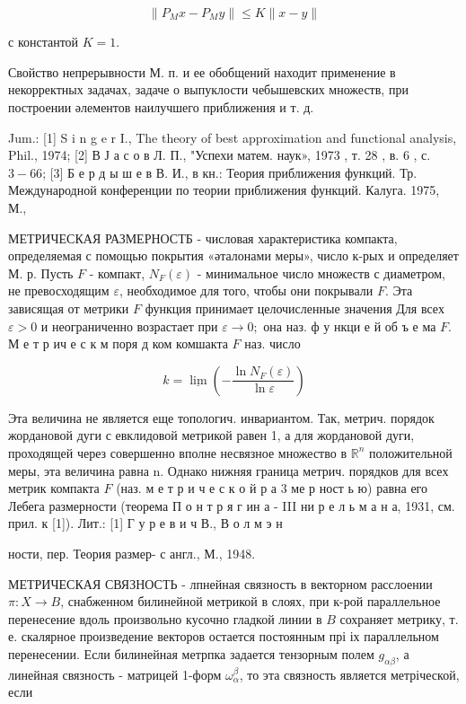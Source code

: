 \documentclass[10pt]{article}
\begin{document}
\[

\left\|P_{M} x-P_{M} y\right\| \leqslant K\|x-y\|

\]



с константой $K=1$.



Свойство непрерывности М. п. и ее обобщений находит применение в некорректных задачах, задаче о выпуклости чебышевских множеств, при построении әлементов наилучшего приближения и т. д.



Jum.: [1] S i $\mathrm{n}$ g e r I., The theory of best approximation and functional analysis, Phil., 1974; [2] В Ј а с о в Л. П., "Успехи матем. наук», 1973 , т. 28 , в. 6 , с. $3-66$; [3] Б е р д ы ш е в В. И., в кн.: Теория приближения функций. Тр. Международной конференции по теории приближения функций. Калуга. 1975, М.,



МЕТРИЧЕСКАЯ РАЗМЕРНОСТБ - числовая характеристика компакта, определяемая с помощью покрытия «әталонами меры», число к-рых и определяет М. р. Пусть $F$ - компакт, $N_{F}(\varepsilon)$ - минимальное число множеств с диаметром, не превосходящим $\varepsilon$, необходимое для того, чтобы они покрывали $F$. Эта зависящая от метрики $F$ функция принимает целочисленные значения Для всех $\varepsilon>0$ и неограниченно возрастает при $\varepsilon \rightarrow 0 ;$ она наз. ф у нкци е й об ъ е ма $F$. М е т р ич е с к м поря д ком комшакта $F$ наз. число



\[

k=\underline{\lim }\left(-\frac{\ln N_{F}(\varepsilon)}{\ln \varepsilon}\right)

\]



Эта величина не является еще топологич. инвариантом. Так, метрич. порядок жордановой дуги с евклидовой метрикой равен 1, а для жордановой дуги, проходящей через совершенно вполне несвязное множество в $\mathbb{R}^{n}$ положительной меры, эта величина равна n. Однако нижняя граница метрич. порядков для всех метрик компакта $F$ (наз. м е т р и ч е с к о й р а 3 ме р ност ь ю) равна его Лебега размерности (теорема П о н т р я г ин а - III ни р е л ь м а н а, 1931, см. прил. к [1]). Лит.: [1] Г у р е в и ч В., В о л м э н

ности, пер. Теория размер- с англ., М., 1948.



МЕТРИЧЕСКАЯ СВЯЗНОСТЬ - лпнейная связность в векторном расслоении $\pi: X \rightarrow B$, снабженном билинейной метрикой в слоях, при к-рой параллельное перенесение вдоль произвольно кусочно гладкой линии в $B$ сохраняет метрику, т. е. скалярное произведение векторов остается постоянным прі іх параллельном перенесении. Если билинейная метрпка задается тензорным полем $g_{\alpha \beta}$, а линейная связность - матрицей 1-форм $\omega_{\alpha}^{\beta}$, то эта связность является метріческой, если
\end{document}
